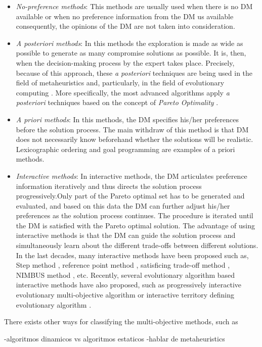\begin{itemize}
	\item \emph{No-preference methods}: This methods are usually used when there is no DM available or when no preference information from the DM us available consequently, the opinions of the DM are not taken into consideration.
	\item \emph{A posteriori methods}: In this methods the exploration is made as wide as possible to generate as many compromise solutions as possible. It is, then, when the decision-making process by the expert takes place. Precisely, because of this approach, these \emph{a posteriori} techniques are being used in the field of metaheuristics and, particularly, in the field of evolutionary computing \cite{coello07evolutionary, deb01multiobjective}. More specifically, the most advanced algorithms apply \emph{a posteriori} techniques based on the concept of \emph{Pareto Optimality} \cite{pareto96cours}.
	\item \emph{A priori methods}: In this methods, the DM specifies his/her preferences before the solution process. The main withdraw of this method is that DM does not necessarily know beforehand whether the solutions will be realistic. Lexicographic ordering \cite{fishburn1974exceptional} and goal programming \cite{charnes1977goal,charnes1955optimal} are examples of a priori methods.
    \item \emph{Interactive methods}: In interactive methods, the DM articulates preference information iteratively and thus directs the solution process progressively.Only part of the Pareto optimal set has to be generated and evaluated, and based on this data the DM can further adjust his/her preferences as the solution process continues. The procedure is iterated until the DM is satisfied with the Pareto optimal solution. The advantage of using interactive methods is that the DM can guide the solution process and simultaneously learn about the different trade-offs between different solutions. In the last decades, many interactive methods have been proposed such as, Step method \cite{benayoun1971linear}, reference point method \cite{wierzbicki1980use}, satisficing trade-off method \cite{nakayama1984satisficing}, NIMBUS method \cite{miettinen1995interactive}, etc. Recently, several evolutionary algorithm based interactive methods have also proposed, such as progressively interactive evolutionary multi-objective algorithm \cite{deb2010interactive,nebro2018indm2,fowler2010interactive,phelps2003interactive} or interactive territory defining evolutionary algorithm \cite{koksalan2010interactive}.
\end{itemize}

There exists other ways for classifying the multi-objective methods, such as 


-algoritmos dinamicos vs algoritmos estaticos
-hablar de metaheuristics


   